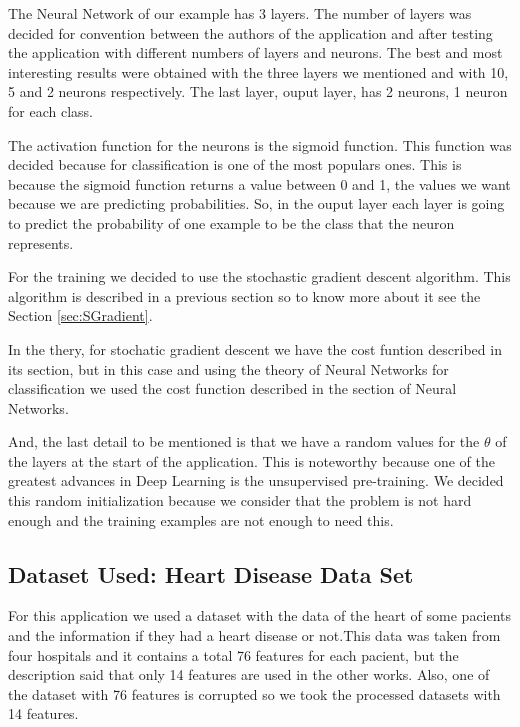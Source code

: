 \documentclass[12pt]{article}
\begin{document}
The Neural Network of our example has 3 layers.  The number of layers was decided for convention between the authors of the application and after testing the application with different numbers of layers and neurons. The best and most interesting results were obtained with the three layers we mentioned and with 10, 5 and 2 neurons respectively. The last layer, ouput layer, has 2 neurons, 1 neuron for each class.

The activation function for the neurons is the sigmoid function. This function was decided because for classification is one of the most populars ones. This is because the sigmoid function returns a value between 0 and 1, the values we want because we are predicting probabilities. So, in the ouput layer each layer is going to predict the probability of one example to be the class that the neuron represents.

For the training we decided to use the stochastic gradient descent algorithm. This algorithm is described in a previous section so to know more about it see the Section \ref{sec:SGradient}.

In the thery, for stochatic gradient descent we have the cost funtion described in its section, but in this case and using the theory of Neural Networks for classification we used the cost function described in the section of Neural Networks.

And, the last detail to be mentioned is that we have a random values for the $\theta$ of the layers at the start of the application. This is noteworthy because one of the greatest advances in Deep Learning is the unsupervised pre-training\cite{erhan2010does,bengio2007greedy}. We decided this random initialization because we consider that the problem is not hard enough and the training examples are not enough to need this.

\subsection{Dataset Used: Heart Disease Data Set \cite{Lichman:2013}}
For this application we used a dataset with the data of the heart of some pacients and the information if they had a heart disease or not.This data was taken from four hospitals and it contains a total 76 features for each pacient, but the description said that only 14 features are used in the other works. Also, one of the dataset with 76 features is corrupted so we took the processed datasets with 14 features. \cite{heartDiseaseC,heartDiseaseZ,heartDiseaseH,heartDiseaseB}
\end{document}

